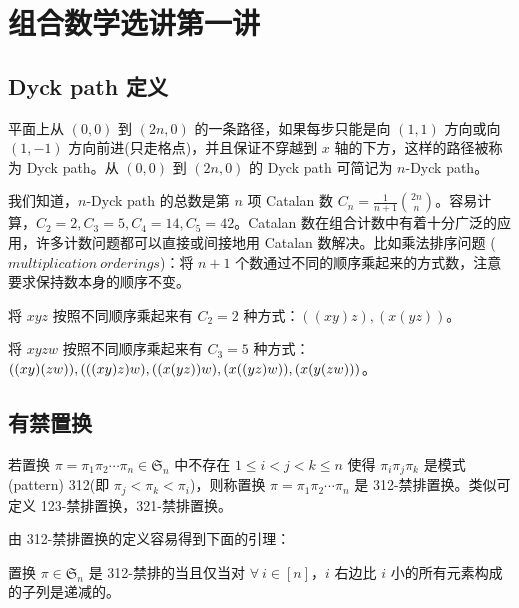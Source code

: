 \chapter{组合数学选讲第一讲}
\label{chpa-1}
\minitoc

\section{Dyck path 定义}
\begin{defi}
平面上从 $(0, 0)$ 到 $(2n, 0)$ 的一条路径，如果每步只能是向 $(1, 1)$
方向或向 $(1, -1)$ 方向前进(只走格点)，并且保证不穿越到 $x$
轴的下方，这样的路径被称为 Dyck path。从 $(0, 0)$ 到 $(2n, 0)$ 的
Dyck path 可简记为 $n$-Dyck path。
\end{defi}
我们知道，$n$-Dyck path 的总数是第 $n$ 项 Catalan 数
$C_{n}=\frac{1}{n+1}{2n\choose n}$。容易计算，$C_{2}=2, C_{3}=5,
C_{4}=14, C_{5}=42$。Catalan
数在组合计数中有着十分广泛的应用，许多计数问题都可以直接或间接地用
Catalan 数解决。比如乘法排序问题 ($multiplication\ orderings$)：将
$n+1$
个数通过不同的顺序乘起来的方式数，注意要求保持数本身的顺序不变。

\begin{ex}
将 $xyz$ 按照不同顺序乘起来有 $C_{2}=2$ 种方式：$((xy)z), (x(yz))$。

将 $xyzw$ 按照不同顺序乘起来有 $C_{3}=5$ 种方式：$((xy)(zw)),
(((xy)z)w), \\((x(yz))w), (x((yz)w)), (x(y(zw)))$。
\end{ex}
\section{有禁置换}

\begin{defi}
若置换 $\pi=\pi_1\pi_2\cdots\pi_n\in\mathfrak{S}_n$ 中不存在 $1\le
i<j<k\le n$ 使得 $\pi_i\pi_j\pi_k$ 是模式 (pattern) 312(即
$\pi_j<\pi_k<\pi_i$)，则称置换 $\pi=\pi_1\pi_2\cdots\pi_n$ 是
312-禁排置换。类似可定义 123-禁排置换，321-禁排置换。
\end{defi}

由 312-禁排置换的定义容易得到下面的引理：

\begin{lem}
置换 $\pi\in\mathfrak{S}_n$ 是 312-禁排的当且仅当对 $\forall\
i\in[n]$，$i$ 右边比 $i$ 小的所有元素构成的子列是递减的。
\end{lem}

